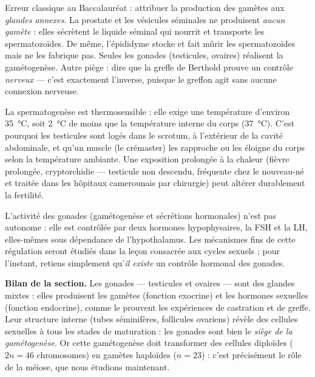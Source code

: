 \documentclass[11pt]{article}
\newcommand{\cle}[1]{{\popxbold\color{popdark}#1}}
\begin{document}
\begin{attention}
Erreur classique au Baccalauréat : attribuer la production des gamètes aux \emph{glandes annexes}. La \cle{prostate} et les \cle{vésicules séminales} ne produisent \emph{aucun gamète} : elles sécrètent le liquide séminal qui nourrit et transporte les spermatozoïdes. De même, l'\cle{épididyme} stocke et fait mûrir les spermatozoïdes mais ne les fabrique pas. Seules les gonades (testicules, ovaires) réalisent la gamétogenèse. Autre piège : dire que la greffe de Berthold prouve un contrôle \emph{nerveux} — c'est exactement l'inverse, puisque le greffon agit sans aucune connexion nerveuse.
\end{attention}

\begin{savaistu}
La spermatogenèse est thermosensible : elle exige une température d'environ \SI{35}{\celsius}, soit \SI{2}{\celsius} de moins que la température interne du corps (\SI{37}{\celsius}). C'est pourquoi les testicules sont logés dans le scrotum, à l'extérieur de la cavité abdominale, et qu'un muscle (le crémaster) les rapproche ou les éloigne du corps selon la température ambiante. Une exposition prolongée à la chaleur (fièvre prolongée, \cle{cryptorchidie} — testicule non descendu, fréquente chez le nouveau-né et traitée dans les hôpitaux camerounais par chirurgie) peut altérer durablement la fertilité.
\end{savaistu}

\begin{aretenir}
L'activité des gonades (gamétogenèse et sécrétions hormonales) n'est pas autonome : elle est contrôlée par deux hormones hypophysaires, la \cle{FSH} et la \cle{LH}, elles-mêmes sous dépendance de l'\cle{hypothalamus}. Les mécanismes fins de cette régulation seront étudiés dans la leçon consacrée aux cycles sexuels ; pour l'instant, retiens simplement qu'\emph{il existe} un contrôle hormonal des gonades.
\end{aretenir}

\textbf{Bilan de la section.} Les gonades — testicules et ovaires — sont des glandes mixtes : elles produisent les gamètes (fonction exocrine) et les hormones sexuelles (fonction endocrine), comme le prouvent les expériences de castration et de greffe. Leur structure interne (tubes séminifères, follicules ovariens) révèle des cellules sexuelles à tous les stades de maturation : les gonades sont bien le \emph{siège de la gamétogenèse}. Or cette gamétogenèse doit transformer des cellules diploïdes ($2n = 46$ chromosomes) en gamètes haploïdes ($n = 23$) : c'est précisément le rôle de la méiose, que nous étudions maintenant.
\end{document}

